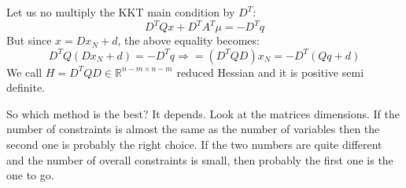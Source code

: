 Let us no multiply the KKT main condition by $D^T$:
\begin{equation}
    D^T Q x + D^T A^T \mu = -D^T q
\end{equation}
But since $x = D x_N + d$, the above equality becomes:
\begin{equation}
    D^T Q (D x_N + d) = -D^T q \Rightarrow = (D^T Q D) x_N = -D^T(Q q + d)
\end{equation}
We call $H = D^T Q D \in \mathbb{R}^{n-m \times n-m}$ reduced Hessian and it is positive semi definite.
\par So which method is the best? It depends. Look at the matrices dimensions. If the number of constraints is almost the same as the number of variables then the second one is probably the right choice. If the two numbers are quite different and the number of overall constraints is small, then probably the first one is the one to go.
%
%
%
